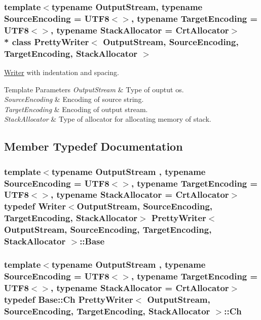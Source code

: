 \subsubsection*{template$<$typename Output\+Stream, typename Source\+Encoding = U\+T\+F8$<$$>$, typename Target\+Encoding = U\+T\+F8$<$$>$, typename Stack\+Allocator = Crt\+Allocator$>$\\*
class Pretty\+Writer$<$ Output\+Stream, Source\+Encoding, Target\+Encoding, Stack\+Allocator $>$}

\hyperlink{classWriter}{Writer} with indentation and spacing. 


\begin{DoxyTemplParams}{Template Parameters}
{\em Output\+Stream} & Type of ouptut os. \\
\hline
{\em Source\+Encoding} & Encoding of source string. \\
\hline
{\em Target\+Encoding} & Encoding of output stream. \\
\hline
{\em Stack\+Allocator} & Type of allocator for allocating memory of stack. \\
\hline
\end{DoxyTemplParams}


\subsection{Member Typedef Documentation}
\subsubsection[{\texorpdfstring{Base}{Base}}]{\setlength{\rightskip}{0pt plus 5cm}template$<$typename Output\+Stream , typename Source\+Encoding  = U\+T\+F8$<$$>$, typename Target\+Encoding  = U\+T\+F8$<$$>$, typename Stack\+Allocator  = Crt\+Allocator$>$ typedef {\bf Writer}$<$Output\+Stream, Source\+Encoding, Target\+Encoding, Stack\+Allocator$>$ {\bf Pretty\+Writer}$<$ Output\+Stream, Source\+Encoding, Target\+Encoding, Stack\+Allocator $>$\+::{\bf Base}}\hypertarget{classPrettyWriter_ab6074f4c51db129e195bc5752eb2b448}{}\label{classPrettyWriter_ab6074f4c51db129e195bc5752eb2b448}
\subsubsection[{\texorpdfstring{Ch}{Ch}}]{\setlength{\rightskip}{0pt plus 5cm}template$<$typename Output\+Stream , typename Source\+Encoding  = U\+T\+F8$<$$>$, typename Target\+Encoding  = U\+T\+F8$<$$>$, typename Stack\+Allocator  = Crt\+Allocator$>$ typedef {\bf Base\+::\+Ch} {\bf Pretty\+Writer}$<$ Output\+Stream, Source\+Encoding, Target\+Encoding, Stack\+Allocator $>$\+::{\bf Ch}}\hypertarget{classPrettyWriter_ae5f474c0f087932d795c1cb4b9d0c312}{}\label{classPrettyWriter_ae5f474c0f087932d795c1cb4b9d0c312}


